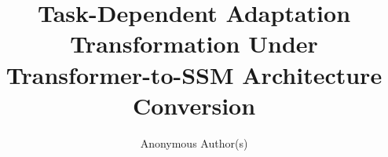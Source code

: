 \documentclass[10pt,twocolumn]{article}
\title{Task-Dependent Adaptation Transformation Under\\Transformer-to-SSM Architecture Conversion}
\author{Anonymous Author(s)}
\date{}
\begin{document}
\maketitle

\begin{abstract}

\end{abstract}











\end{document}
